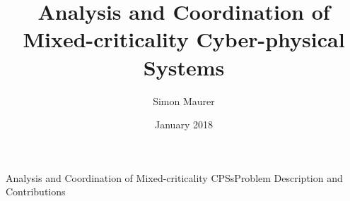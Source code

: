 \documentclass{beamer}
\title[Analysis and Coordination of Mixed-criticality CPSs]{Analysis and Coordination of Mixed-criticality Cyber-physical Systems}
\author{Simon Maurer}
\institute %
{
    School of Computer Science\\
    University of Hertfordshire\\
    Hatfield, United Kingdom}
\date{January 2018}
\begin{document}
{
\begin{frame}[plain]
    \titlepage
    \addtocounter{framenumber}{-1}
\end{frame}
}



\begin{frame}{Analysis and Coordination of Mixed-criticality CPSs}{Problem Description and Contributions}
        \centering
    \begin{overlayarea}{7cm}{7cm}

\end{overlayarea}
\end{frame}
\end{document}
